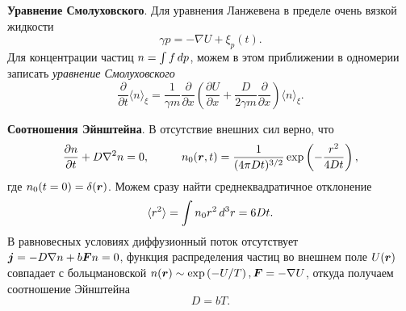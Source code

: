 \textbf{Уравнение Смолуховского}. Для уравнения Ланжевена в пределе очень вязкой жидкости
\begin{equation*}
	\gamma p = - \nabla U +\xi_p (t).
\end{equation*}
Для концентрации частиц $n = \int f \, d p$, можем в этом приближении в одномерии записать \textit{уравнение Смолуховского}
\begin{equation*}
	\frac{\partial }{\partial t} \langle n\rangle_\xi = \frac{1}{\gamma m} \frac{\partial }{\partial x} \left(
		\frac{\partial U}{\partial x}  + \frac{D}{2\gamma m} \frac{\partial }{\partial x} 
	\right) \langle n\rangle_\xi.
\end{equation*}


\textbf{Соотношения Эйнштейна}. В отсутствие внешних сил верно, что
\begin{equation*}
	\frac{\partial n}{\partial t} + D \nabla^2 n= 0,
	\hspace{10 mm} 
	n_0 (\vc{r}, t) = \frac{1}{(4 \pi D t)^{3/2}} \exp\left(- \frac{r^2}{4 D t}\right),
\end{equation*}
где $n_0(t = 0) = \delta(\boldsymbol{r})$. Можем сразу найти среднеквадратичное отклонение
\begin{equation*}
	\langle r^2\rangle = \int n_0 r^2 \, d^3 r = 6 D t.
\end{equation*}
В равновесных условиях диффузионный поток отсутствует $\boldsymbol{j} = - D \nabla n + b \boldsymbol{F} n = 0$, функция распределения частиц во внешнем поле $U(\boldsymbol{r})$ совпадает с больцмановской $n(\boldsymbol{r}) \sim \exp\left( - U / T\right), \boldsymbol{F} = - \nabla U$, откуда получаем соотношение Эйнштейна
\begin{equation}
 	\boxed{D = b T}.
 \end{equation} 
